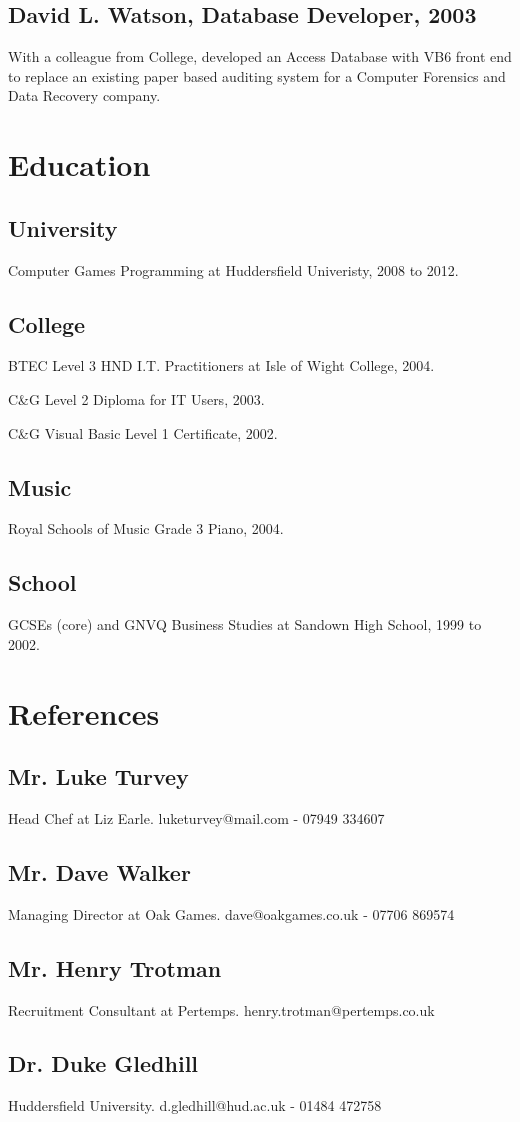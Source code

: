 \documentclass{article}
\begin{document}
\subsection{David L. Watson, Database Developer, 2003}
With a colleague from College, developed an Access Database with VB6 front end to replace an existing paper based auditing system for a Computer Forensics and Data Recovery company.

\section{Education}
\subsection{University}
Computer Games Programming at Huddersfield Univeristy, 2008 to 2012.
\subsection{College}
BTEC Level 3 HND I.T. Practitioners at Isle of Wight College, 2004.

C\&G Level 2 Diploma for IT Users, 2003.

C\&G Visual Basic Level 1 Certificate, 2002.
\subsection{Music}
Royal Schools of Music Grade 3 Piano, 2004.
\subsection{School}
GCSEs (core) and GNVQ Business Studies at Sandown High School, 1999 to 2002.

\section{References}
\subsection{Mr. Luke Turvey}
Head Chef at Liz Earle.  luketurvey@mail.com - 07949 334607
\subsection{Mr. Dave Walker}
Managing Director at Oak Games.  dave@oakgames.co.uk - 07706 869574
\subsection{Mr. Henry Trotman}
Recruitment Consultant at Pertemps.  henry.trotman@pertemps.co.uk
\subsection{Dr. Duke Gledhill}
Huddersfield University.  d.gledhill@hud.ac.uk - 01484 472758
\end{document}
